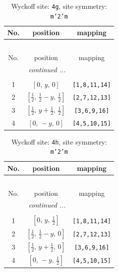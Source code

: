\documentclass[fleqn,8pt]{jsarticle}
\begin{document}
\renewcommand{\arraystretch}{1.2}
\begin{longtable}{ccc}
\caption{Wyckoff site: {\tt 4g}, site symmetry: {\tt m'2'm}}
 \\
 \hline \hline
No. & position & mapping \\ \hline \endfirsthead

\multicolumn{2}{l}{\tablename\ \thetable{}} \\
 \hline \hline
No. & position & mapping \\ \hline \endhead

 \hline \hline
\multicolumn{2}{r}{\footnotesize\it continued ...} \\ \endfoot

 \hline \hline
\multicolumn{2}{r}{} \\ \endlastfoot

1 & $\left[ 0,\, y,\, 0 \right]$ & {\tt [1,8,11,14]} \\ \hline
2 & $\left[ \frac{1}{2},\, \frac{1}{2} - y,\, \frac{1}{2} \right]$ & {\tt [2,7,12,13]} \\ \hline
3 & $\left[ \frac{1}{2},\, y + \frac{1}{2},\, \frac{1}{2} \right]$ & {\tt [3,6,9,16]} \\ \hline
4 & $\left[ 0,\, - y,\, 0 \right]$ & {\tt [4,5,10,15]} \\
\end{longtable}
\renewcommand{\arraystretch}{1.2}
\begin{longtable}{ccc}
\caption{Wyckoff site: {\tt 4h}, site symmetry: {\tt m'2'm}}
 \\
 \hline \hline
No. & position & mapping \\ \hline \endfirsthead

\multicolumn{2}{l}{\tablename\ \thetable{}} \\
 \hline \hline
No. & position & mapping \\ \hline \endhead

 \hline \hline
\multicolumn{2}{r}{\footnotesize\it continued ...} \\ \endfoot

 \hline \hline
\multicolumn{2}{r}{} \\ \endlastfoot

1 & $\left[ 0,\, y,\, \frac{1}{2} \right]$ & {\tt [1,8,11,14]} \\ \hline
2 & $\left[ \frac{1}{2},\, \frac{1}{2} - y,\, 0 \right]$ & {\tt [2,7,12,13]} \\ \hline
3 & $\left[ \frac{1}{2},\, y + \frac{1}{2},\, 0 \right]$ & {\tt [3,6,9,16]} \\ \hline
4 & $\left[ 0,\, - y,\, \frac{1}{2} \right]$ & {\tt [4,5,10,15]} \\
\end{longtable}
\end{document}
